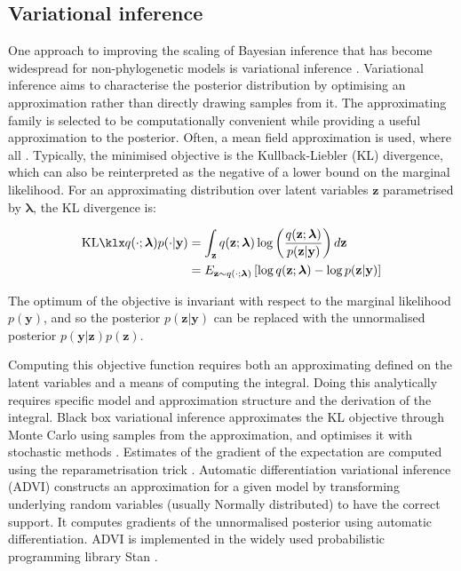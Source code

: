 \subsection*{Variational inference}

One approach to improving the scaling of Bayesian inference that has become widespread for non-phylogenetic models is variational inference \cite{jordan1999introduction}. Variational inference aims to characterise the posterior distribution by optimising an approximation rather than directly drawing samples from it. The approximating family is selected to be computationally convenient while providing a useful approximation to the posterior. Often, a mean field approximation is used, where all . Typically, the minimised objective is the Kullback-Liebler (KL) divergence, which can also be reinterpreted as the negative of a lower bound on the marginal likelihood. For an approximating distribution over latent variables $\mathbf{z}$ parametrised by $\bm{\lambda}$, the KL divergence is:

\begin{align*}
\kl{q(\cdot;\bm{\lambda})}{p(\cdot|\mathbf{y})} &= \int_\mathbf{z}q(\mathbf{z};\bm{\lambda})\log\left(\frac{q(\mathbf{z};\bm{\lambda})}{p(\mathbf{z}|\mathbf{y})}\right)d\mathbf{z} \\
    &= E_{\mathbf{z}\sim q(\cdot;\bm{\lambda})}\left[ \log q(\mathbf{z};\bm{\lambda}) - \log p(\mathbf{z}|\mathbf{y})\right]
\end{align*}

The optimum of the objective is invariant with respect to the marginal likelihood $p(\mathbf{y})$, and so the posterior $p(\mathbf{z}|\mathbf{y})$ can be replaced with the unnormalised posterior $p(\mathbf{y}|\mathbf{z})p(\mathbf{z})$.

Computing this objective function requires both an approximating defined on the latent variables and a means of computing the integral. Doing this analytically requires specific model and approximation structure and the derivation of the integral. Black box variational inference \cite{ranganath2014black}approximates the KL objective through Monte Carlo using samples from the approximation, and optimises it with stochastic methods \cite{robbins1951stochastic}. Estimates of the gradient of the expectation are computed using the reparametrisation trick \cite{kingma2013auto}. Automatic differentiation variational inference (ADVI) \cite{kucukelbir2017automatic} constructs an approximation for a given model by transforming underlying random variables (usually Normally distributed) to have the correct support. It computes gradients of the unnormalised posterior using automatic differentiation. ADVI is implemented in the widely used probabilistic programming library Stan \cite{carpenter2017stan}.

